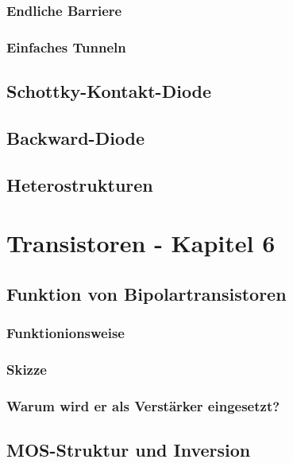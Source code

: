 \documentclass{article}
\begin{document}
    \subsubsection{Endliche Barriere}
    \subsubsection{Einfaches Tunneln}

\subsection{Schottky-Kontakt-Diode }\label{k5:schottky}

\subsection{Backward-Diode }\label{k5:backward}

\subsection{Heterostrukturen }\label{k5:heterostrukturen}


\section{Transistoren - Kapitel 6}
\subsection{Funktion von Bipolartransistoren }\label{k6:bipolar}
    \subsubsection{Funktionionsweise}
    \subsubsection{Skizze}
    \subsubsection{Warum wird er als Verst\"arker eingesetzt?}
\subsection{MOS-Struktur und Inversion }\label{k6:mosInversion}
\end{document}
